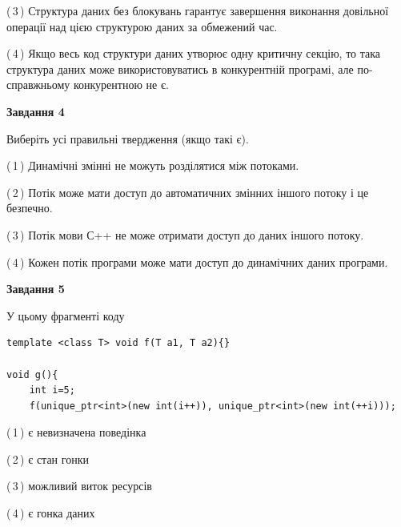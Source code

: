 \documentclass[12pt, ukrainian]{article}
\begin{document}
\begin {large}
{(\,3\,) Структура даних без блокувань гарантує завершення виконання довільної операції над цією структурою даних за обмежений час.%

(\,4\,) Якщо весь код структури даних утворює одну критичну секцію, то така структура даних може використовуватись в конкурентній програмі, але по-справжньо\-му конкурентною не є.%



\begin{center}
\textbf{Завдання 4}
\end{center}
Виберіть усі правильні твердження (якщо такі є).\par
\vspace{2mm}

(\,1\,) Динамічні змінні не можуть розділятися між потоками.%

(\,2\,) Потік може мати доступ до автоматичних змінних іншого потоку і це безпечно.%

(\,3\,) Потік мови С++ не може отримати доступ до даних іншого потоку.%

(\,4\,) Кожен потік програми може мати доступ до динамічних даних програми.%



\begin{center}
\textbf{Завдання 5}
\end{center}
У цьому фрагменті коду
\begin{verbatim}
template <class T> void f(T a1, T a2){}

void g(){
    int i=5;
    f(unique_ptr<int>(new int(i++)), unique_ptr<int>(new int(++i)));
\end{verbatim}

(\,1\,) є невизначена поведінка%

(\,2\,) є стан гонки%

(\,3\,) можливий виток ресурсів%

(\,4\,) є гонка даних%


}
\end {large}
\end{document}
